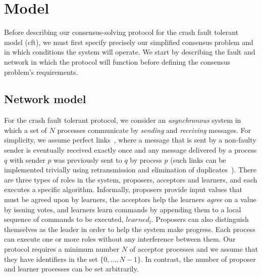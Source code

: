 \section{Model} \label{cft_model}

Before describing our consensus-solving protocol for the crash fault tolerant model (\acrshort{cft}), we must first specify precisely our simplified consensus problem and in which conditions the system will operate. We start by describing the fault and network in which the protocol will function before defining the consensus problem's requirements.

\subsection{Network model}
For the crash fault tolerant protocol, we consider an \emph{asynchronous} system in which a set of $N$ processes communicate by \emph{sending} and \emph{receiving} messages. For simplicity, we assume perfect links~\cite{cgr:book}, where a message that is sent by a non-faulty sender is eventually received exactly once and any message delivered by a process $q$ with sender $p$ was previously sent to $q$ by process $p$ (such links can be implemented trivially using retransmission and elimination of duplicates~\cite{cgr:book}). There are three types of roles in the system, proposers, acceptors and learners, and each executes a specific algorithm. Informally, proposers provide input values that must be agreed upon by learners, the acceptors help the learners \emph{agree} on a value by issuing votes, and learners learn commands by appending them to a local sequence of commands to be executed, $learned_l$. Proposers can also distinguish themselves as the leader in order to help the system make progress. Each process can execute one or more roles without any interference between them. Our protocol requires a minimum number $N$ of acceptor processes and we assume that they have identifiers in the set $\{0,...,N-1\}$. In contrast, the number of proposer and learner processes can be set arbitrarily.

